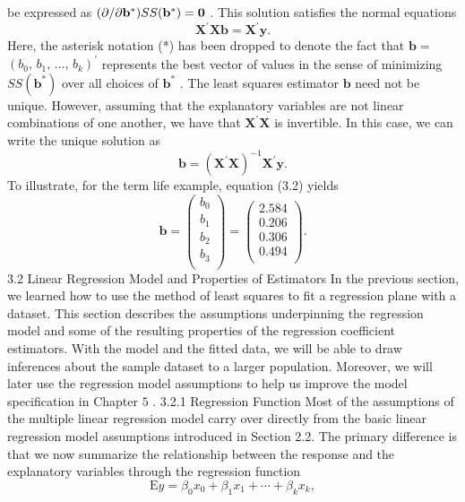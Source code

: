 \documentclass[11pt]{article}
\begin{document}
be expressed as \(( \partial/ \partial{\bf b}^{*} ) S S ( {\bf b}^{*} )={\bf0}\) . This solution satisfies the normal equations
\[
\mathbf{X}^{\prime} \mathbf{X} \mathbf{b}=\mathbf{X}^{\prime} \mathbf{y} . \tag{3.3}
\]
Here, the asterisk notation (*) has been dropped to denote the fact that \(\mathbf{b}=\)
\(( b_{0} , \, b_{1} , \, \dots, \, b_{k} )^{\prime}\) represents the best vector of values in the sense of minimizing
\(S S ( \mathbf{b^{*}} )\) over all choices of \(\mathbf{b^{*}}\) .
 The least squares estimator \(\mathbf{b}\) need not be unique. However, assuming that the
 explanatory variables are not linear combinations of one another, we have that
\(\mathbf{X}^{\prime} \mathbf{X}\) is invertible. In this case, we can write the unique solution as
\[
\mathbf{b}=\left( \mathbf{X}^{\prime} \mathbf{X} \right)^{-1} \mathbf{X}^{\prime} \mathbf{y} . \tag{3.4}
\]
To illustrate, for the term life example, equation (3.2) yields
\[
\mathbf{b}=\left( \begin{matrix} {b_{0}} \\ {b_{1}} \\ {b_{2}} \\ {b_{3}} \\ \end{matrix} \right)=\left( \begin{matrix} {2 . 5 8 4} \\ {0 . 2 0 6} \\ {0 . 3 0 6} \\ {0 . 4 9 4} \\ \end{matrix} \right) .
\]
 3.2 Linear Regression Model and Properties of Estimators
In the previous section, we learned how to use the method of least squares to
fit a regression plane with a dataset. This section describes the assumptions
underpinning the regression model and some of the resulting properties of the
regression coefficient estimators. With the model and the fitted data, we will be
 able to draw inferences about the sample dataset to a larger population. Moreover,
we will later use the regression model assumptions to help us improve the model
 specification in Chapter \(5\) .
3.2.1 Regression Function
 Most of the assumptions of the multiple linear regression model carry over directly
from the basic linear regression model assumptions introduced in Section 2.2.
The primary difference is that we now summarize the relationship between the
response and the explanatory variables through the regression function
\[
\textrm{E} y=\beta_{0} x_{0}+\beta_{1} x_{1}+\cdots+\beta_{k} x_{k} , \tag{3.5}
\]
\end{document}
